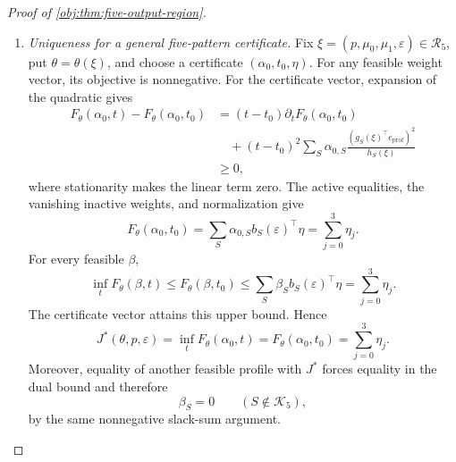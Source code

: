 \begin{proof}[Proof of \cref{obj:thm:five-output-region}]
\begin{enumerate}
For the channel assertion, define
\[
Q^{\mathrm{sw}}(x,A)=Q(\mathfrak s x,A).
\]
This is a probability kernel and satisfies the same privacy inequalities
as \(Q\), since those inequalities hold for every input pair.
In the next identities, quantities for \(Q^{\mathrm{sw}}\) are evaluated
at assignment probability \(q\), and those for \(Q\) at \(p\).
Reindexing the four record probabilities gives equality of the output
laws; reindexing their derivatives exchanges the two parameter
coordinates. Therefore
\[
P_{\theta_{\mathrm{cen}}}Q^{\mathrm{sw}}
=
P_{\theta_{\mathrm{cen}}}Q,
\qquad
I_{\theta_{\mathrm{cen}}}(Q^{\mathrm{sw}})
=
\Pi I_{\theta_{\mathrm{cen}}}(Q)\Pi.
\]
The contrast variance is preserved by this matrix exchange. Indeed,
\(\Pi c=-c\), and for every \(v_{\mathrm{sol}}\in\mathbb R^2\),
\[
Iv_{\mathrm{sol}}=c
\quad\Longleftrightarrow\quad
(\Pi I\Pi)(-\Pi v_{\mathrm{sol}})=c,
\qquad
c^\top(-\Pi v_{\mathrm{sol}})=c^\top v_{\mathrm{sol}}.
\]
Thus the solution-value sets coincide; if they are empty, both contrast
variances equal \(+\infty\). In either case,
\[
\mathcal V(\Pi I\Pi)=\mathcal V(I).
\]
An attaining \(Q\) at \(p\) consequently gives an attaining
\(Q^{\mathrm{sw}}\) at \(q\). The centered bound yields
\(\kappa(Q^{\mathrm{sw}})\ge5\). Equality of their output laws, on the same
output space, gives
\[
\kappa(Q^{\mathrm{sw}})=\kappa(Q),
\]
and hence the desired bound at \(p\).

\item \textit{Uniqueness for a general five-pattern certificate.}
Fix \(\xi=(p,\mu_0,\mu_1,\varepsilon)\in\mathcal R_5\), put
\(\theta=\theta(\xi)\), and choose a certificate \((\alpha_0,t_0,\eta)\).
For any feasible weight vector, its objective is nonnegative.
For the certificate vector, expansion of the quadratic gives
\[
\begin{aligned}
F_\theta(\alpha_0,t)-F_\theta(\alpha_0,t_0)
&=(t-t_0)\partial_tF_\theta(\alpha_0,t_0)\\
&\quad+(t-t_0)^2
 \sum_S\alpha_{0,S}
 \frac{(g_S(\xi)^\top e_{\mathrm{prof}})^2}{h_S(\xi)}\\
&\ge0,
\end{aligned}
\]
where stationarity makes the linear term zero.
The active equalities, the vanishing inactive weights, and normalization
give
\[
F_\theta(\alpha_0,t_0)
=
\sum_S\alpha_{0,S}b_S(\varepsilon)^\top\eta
=
\sum_{j=0}^3\eta_j.
\]
For every feasible \(\beta\),
\[
\inf_tF_\theta(\beta,t)
\le F_\theta(\beta,t_0)
\le\sum_S\beta_Sb_S(\varepsilon)^\top\eta
=\sum_{j=0}^3\eta_j.
\]
The certificate vector attains this upper bound. Hence
\[
J^*(\theta,p,\varepsilon)
=
\inf_tF_\theta(\alpha_0,t)
=
F_\theta(\alpha_0,t_0)
=
\sum_{j=0}^3\eta_j.
\]
Moreover, equality of another feasible profile with \(J^*\) forces
equality in the dual bound and therefore
\[
\beta_S=0\qquad(S\notin\mathcal K_5),
\]
by the same nonnegative slack-sum argument.


\end{enumerate}
\end{proof}

